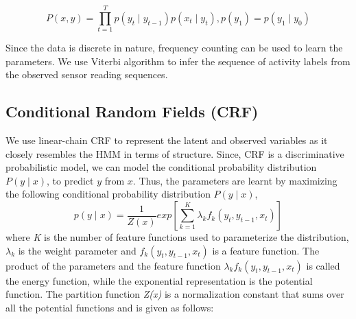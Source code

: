 \documentclass[11pt, oneside]{article}   	%
\begin{document}

\begin{equation}
P(x,y)=\prod_{t=1}^{T}p(y_{t}\mid y_{t-1})p(x_{t}\mid y_{t}), p(y_{1}) = p(y_{1}\mid y_{0})
\end{equation}

Since the data is discrete in nature, frequency counting can be used to learn the parameters. We use Viterbi algorithm to infer the sequence of activity labels from the observed sensor reading sequences. 

\subsection{Conditional Random Fields (CRF)}
We use linear-chain CRF to represent the latent and observed variables as it closely resembles the HMM in terms of structure. Since, CRF is a discriminative probabilistic model, we can model the conditional probability distribution $P(y \mid x)$, to predict $y$ from $x$. Thus, the parameters are learnt by maximizing the following  conditional probability distribution $P(y \mid x)$,
\begin{equation}
p(y\mid x)=\frac{1}{Z(x)}exp\left[{\sum_{k=1}^{K}}{\lambda}_{k}{f}_{k}({y}_{t},{y}_{t-1},{x}_{t})\right]
\end{equation}
where \textit{K} is the number of feature functions used to parameterize the distribution, ${\lambda}_{k}$ is the weight parameter and ${f}_{k}({y}_{t},{y}_{t-1},{x}_{t})$ is a feature function. 
The product of the parameters and the feature function ${\lambda}_{k}{f}_{k}({y}_{t},{y}_{t-1},{x}_{t})$ is called the energy function, while the exponential representation is the potential function. The partition function \textit{Z(x)} is a normalization constant that sums over all the potential functions and is given as follows:
\end{document}
